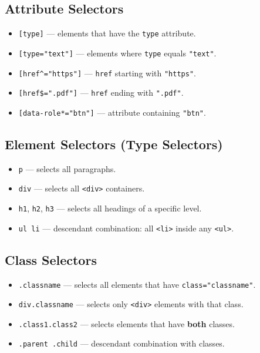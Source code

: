 \documentclass[hidelinks]{article}
\begin{document}
\subsection{Attribute Selectors}
\begin{itemize}
  \item \texttt{[type]} --- elements that have the \texttt{type} attribute.
  \item \texttt{[type="text"]} --- elements where \texttt{type} equals \texttt{"text"}.
  \item \texttt{[href\textasciicircum="https"]} --- \texttt{href} starting with \texttt{"https"}.
  \item \texttt{[href\$=".pdf"]} --- \texttt{href} ending with \texttt{".pdf"}.
  \item \texttt{[data-role*="btn"]} --- attribute containing \texttt{"btn"}.
\end{itemize}

\subsection{Element Selectors (Type Selectors)}
\begin{itemize}
  \item \texttt{p} --- selects all paragraphs.
  \item \texttt{div} --- selects all \texttt{<div>} containers.
  \item \texttt{h1}, \texttt{h2}, \texttt{h3} --- selects all headings of a specific level.
  \item \texttt{ul li} --- descendant combination: all \texttt{<li>} inside any \texttt{<ul>}.
\end{itemize}

\subsection{Class Selectors}
\begin{itemize}
  \item \texttt{.classname} --- selects all elements that have \texttt{class="classname"}.
  \item \texttt{div.classname} --- selects only \texttt{<div>} elements with that class.
  \item \texttt{.class1.class2} --- selects elements that have \textbf{both} classes.
  \item \texttt{.parent .child} --- descendant combination with classes.
\end{itemize}
\end{document}
